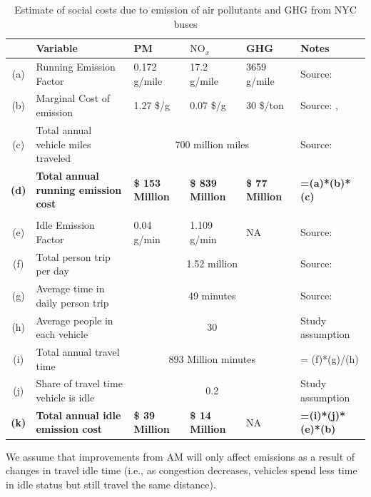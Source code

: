\documentclass[11pt, letterpaper]{article}
\begin{document}
\begin{enumerate}[leftmargin=*]
\begin{table}[h]
\caption{Estimate of social costs due to emission of air pollutants and GHG from NYC buses}
\vspace{0.2em}
\centering
\footnotesize
\renewcommand{\arraystretch}{1.1}
\begin{tabular}{c | m{10em} | m{7em} | m{7em} | m{7em} | l}
\hline
 	& Variable 							& PM 	& $\mbox{NO}_x$	& GHG		& Notes 						\\\hline\hline
(a)	& Running Emission Factor				& 0.172 g/mile	& 17.2 g/mile	& 3659 g/mile	& Source: \cite{busemission} \\
(b)	& Marginal Cost of emission				& 1.27 \$/g	& 0.07 \$/g	& 30 \$/ton	& Source:	\cite{EIA}, \cite{EASIUR}					\\
(c)	& Total annual vehicle miles traveled			& \multicolumn{3}{c|}{700 million miles}		& Source:	\cite{nyctransit}					\\
\textbf{(d)}	& \textbf{Total annual running emission cost}	& \textbf{\$ 153 Million} & 	 \textbf{\$ 839 Million} & \textbf{\$ 77 Million}		& \textbf{=(a)*(b)*(c)}			\\
& & & & & \\
(e)	& Idle Emission Factor					& 0.04 g/min & 1.109 g/min	& NA			& Source:	 \cite{busemission}\\
(f)	& Total person trip per day					& \multicolumn{3}{c|}{1.52 million}			& Source:	\cite{nyctransit} \\
(g)	& Average time in daily person trip			& \multicolumn{3}{c|}{49 minutes}			& Source:	\cite{nyctransit}\\
(h)	& Average people in each vehicle			& \multicolumn{3}{c|}{30}					& Study assumption			\\
(i)	& Total annual travel time					& \multicolumn{3}{c|}{893 Million minutes}		& = (f)*(g)/(h)				\\
(j)	& Share of travel time vehicle is idle			& \multicolumn{3}{c|}{0.2}					& Study assumption			\\
\textbf{(k)}	& \textbf{Total annual idle emission cost}	& \textbf{\$ 39 Million} &  \textbf{\$ 14 Million} & NA 	& \textbf{=(i)*(j)*(e)*(b)}	\\\hline
\end{tabular}
\label{tab:emission.cost}
\end{table}%

  We assume that improvements from AM will only affect emissions as a result of changes in travel idle time
  (i.e., as congestion decreases, vehicles spend less time in idle status but still travel the same distance).

\end{enumerate}
\end{document}
